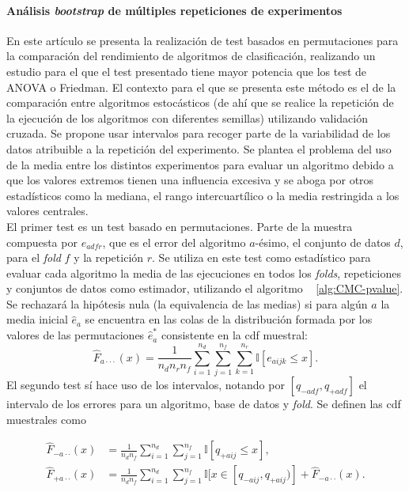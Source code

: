 	\paragraph{Análisis \textit{bootstrap} de múltiples 
repeticiones de experimentos} \cite{OTERO13} En este artículo 
se presenta la realización de test basados en permutaciones 
para la comparación del rendimiento de algoritmos de 
clasificación, realizando un estudio para el que el test 
presentado tiene mayor potencia que los test de ANOVA o 
Friedman. El contexto para el que se presenta este método es 
el de la comparación entre algoritmos estocásticos (de ahí 
que se realice la repetición de la ejecución de los 
algoritmos con diferentes semillas) utilizando validación 
cruzada. Se propone usar intervalos para recoger parte de la 
variabilidad de los datos atribuible a la repetición del 
experimento. Se plantea el problema del uso de la media entre 
los distintos experimentos para evaluar un algoritmo debido a 
que los valores extremos tienen una influencia excesiva y se 
aboga por otros estadísticos como la mediana, el rango 
intercuartílico o la media restringida a los valores 
centrales.\\
	El primer test es un test basado en permutaciones. Parte 
de la muestra compuesta por $e_{adfr}$, que es el error del 
algoritmo $a$-ésimo, el conjunto de datos $d$, para el 
\textit{fold} $f$ y la repetición $r$. Se utiliza en este 
test como estadístico para evaluar cada algoritmo la media de 
las ejecuciones en todos los \textit{folds}, repeticiones y 
conjuntos de datos como estimador, utilizando el algoritmo ~
\ref{alg:CMC-pvalue}. Se rechazará la hipótesis nula (la 
equivalencia de las medias) si para algún $a$ la media 
inicial $\hat{e}_a$ se encuentra en las colas de la 
distribución formada por los valores de las permutaciones $
\hat{e}_a^*$ consistente en la cdf muestral:
	\[ 
		\hat{F}_{a \cdot \cdot \cdot}(x) =
			\frac{1}{n_d n_r n_f}
			\sum\limits_{i=1}^{n_d}
				\sum\limits_{j=1}^{n_f}
					\sum\limits_{k=1}^{n_r}
						\mathbb{I}[ e_{aijk} \leq x ].
	\]
	El segundo test sí hace uso de los intervalos, notando 
por $[q_{-adf}, q_{+adf}]$ el intervalo de los errores para 
un algoritmo, base de datos y \textit{fold}. Se definen las 
cdf muestrales como
	
\begin{align*}
	\hat{F}_{-a \cdot \cdot}(x) &=
		\frac{1}{n_d n_f}
			\sum\limits_{i=1}^{n_d}
				\sum\limits_{j=1}^{n_f}
					\mathbb{I}[ q_{+aij} \leq x ], \\
	\hat{F}_{+a \cdot \cdot}(x) &=
		\frac{1}{n_d n_f}
			\sum\limits_{i=1}^{n_d}
				\sum\limits_{j=1}^{n_f}
					\mathbb{I}[ x \in [q_{-aij},q_{+aij}) ] +
			\hat{F}_{-a \cdot \cdot}(x) .			
\end{align*}

